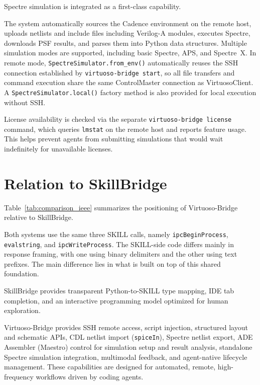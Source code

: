 \documentclass[lettersize,journal]{ieee_template/IEEEtran}
\begin{document}
Spectre simulation is integrated as a first-class capability.


The system automatically sources the Cadence environment on the remote host, uploads netlists and include files including Verilog-A modules, executes Spectre, downloads PSF results, and parses them into Python data structures. Multiple simulation modes are supported, including basic Spectre, APS, and Spectre~X. In remote mode, \texttt{SpectreSimulator.from\_env()} automatically reuses the SSH connection established by \texttt{virtuoso-bridge start}, so all file transfers and command execution share the same ControlMaster connection as VirtuosoClient. A \texttt{SpectreSimulator.local()} factory method is also provided for local execution without SSH.

License availability is checked via the separate \texttt{virtuoso-bridge license} command, which queries \texttt{lmstat} on the remote host and reports feature usage. This helps prevent agents from submitting simulations that would wait indefinitely for unavailable licenses.

\section{Relation to SkillBridge}

Table~\ref{tab:comparison_ieee} summarizes the positioning of Virtuoso-Bridge relative to SkillBridge.

Both systems use the same three SKILL calls, namely \texttt{ipcBeginProcess}, \texttt{evalstring}, and \texttt{ipcWriteProcess}. The SKILL-side code differs mainly in response framing, with one using binary delimiters and the other using text prefixes. The main difference lies in what is built on top of this shared foundation.

SkillBridge provides transparent Python-to-SKILL type mapping, IDE tab completion, and an interactive programming model optimized for human exploration.

Virtuoso-Bridge provides SSH remote access, script injection, structured layout and schematic APIs, CDL netlist import (\texttt{spiceIn}), Spectre netlist export, ADE Assembler (Maestro) control for simulation setup and result analysis, standalone Spectre simulation integration, multimodal feedback, and agent-native lifecycle management. These capabilities are designed for automated, remote, high-frequency workflows driven by coding agents.
\end{document}
